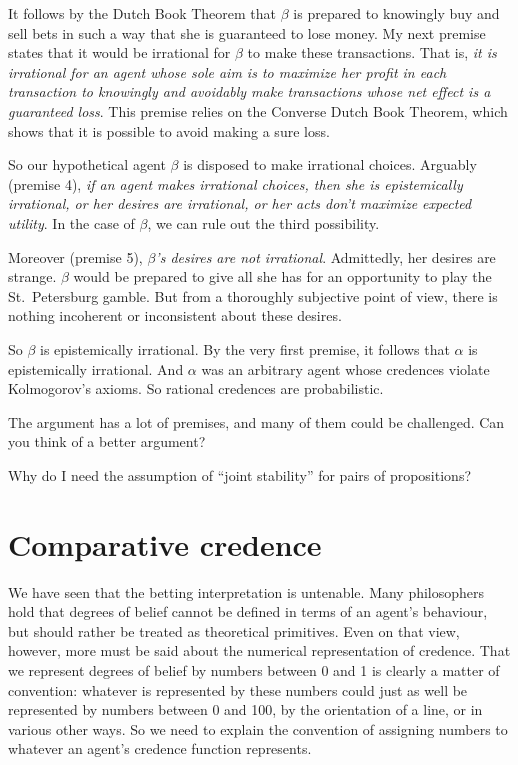 It follows by the Dutch Book Theorem that $\beta$ is prepared to
knowingly buy and sell bets in such a way that she is guaranteed to
lose money. My next premise states that it would be irrational for
$\beta$ to make these transactions. That is, \emph{it is irrational
  for an agent whose sole aim is to maximize her profit in each
  transaction to knowingly and avoidably make transactions whose net
  effect is a guaranteed loss}. This premise relies on the Converse
Dutch Book Theorem, which shows that it is possible to avoid making a
sure loss.

So our hypothetical agent $\beta$ is disposed to make irrational
choices. Arguably (premise 4), \emph{if an agent makes irrational
  choices, then she is epistemically irrational, or her desires are
  irrational, or her acts don't maximize expected utility}. In the
case of $\beta$, we can rule out the third possibility.

Moreover (premise 5), \emph{$\beta$'s desires are not irrational}.
Admittedly, her desires are strange. $\beta$ would be prepared
to give all she has for an opportunity to play the St.\ Petersburg
gamble. But from a thoroughly subjective point of view, there is
nothing incoherent or inconsistent about these desires.

So $\beta$ is epistemically irrational. By the very first premise, it
follows that $\alpha$ is epistemically irrational. And $\alpha$ was an
arbitrary agent whose credences violate Kolmogorov's axioms. So
rational credences are probabilistic.

The argument has a lot of premises, and many of them could be
challenged. Can you think of a better argument?

\begin{exercise3}
  Why do I need the assumption of ``joint stability'' for pairs of
  propositions?
\end{exercise3}



\section{Comparative credence}\label{sec:comparative-credence}

We have seen that the betting interpretation is untenable. Many
philosophers hold that degrees of belief cannot be defined in terms of
an agent's behaviour, but should rather be treated as theoretical
primitives. Even on that view, however, more must be said about the
numerical representation of credence. That we represent degrees of
belief by numbers between 0 and 1 is clearly a matter of convention:
whatever is represented by these numbers could just as well be
represented by numbers between 0 and 100, by the orientation of a line,
or in various other ways. So we need to explain the convention of
assigning numbers to whatever an agent's credence function represents.

